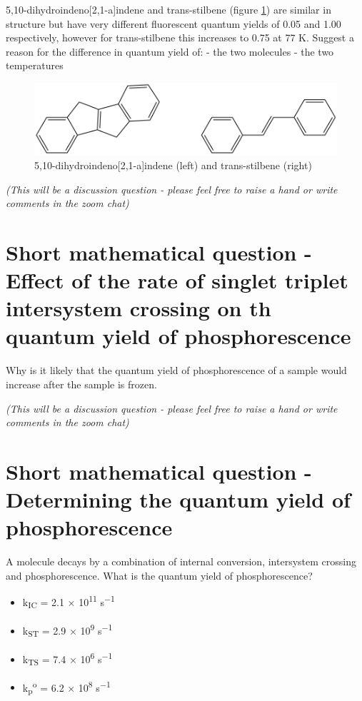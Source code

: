 \documentclass[
]{book}
\providecommand{\tightlist}{%
  \setlength{\itemsep}{0pt}\setlength{\parskip}{0pt}}
\begin{document}
5,10-dihydroindeno{[}2,1-a{]}indene and trans-stilbene (figure \ref{fig:stilbeneindene}) are similar in structure but have very different fluorescent quantum yields of 0.05 and 1.00 respectively, however for trans-stilbene this increases to 0.75 at 77 K. Suggest a reason for the difference in quantum yield of:
- the two molecules
- the two temperatures

\begin{figure}

{\centering \includegraphics[width=0.6\linewidth]{Images/stilbeneindene} 

}

\caption{5,10-dihydroindeno[2,1-a]indene (left) and trans-stilbene (right)}\label{fig:stilbeneindene}
\end{figure}

\emph{(This will be a discussion question - please feel free to raise a hand or write comments in the zoom chat)}

\hypertarget{sec:ratephos}{%
\section{Short mathematical question - Effect of the rate of singlet triplet intersystem crossing on th quantum yield of phosphorescence}\label{sec:ratephos}}

Why is it likely that the quantum yield of phosphorescence of a sample would increase after the sample is frozen.

\emph{(This will be a discussion question - please feel free to raise a hand or write comments in the zoom chat)}

\hypertarget{sec:calcphos}{%
\section{Short mathematical question - Determining the quantum yield of phosphorescence}\label{sec:calcphos}}

A molecule decays by a combination of internal conversion, intersystem crossing and phosphorescence. What is the quantum yield of phosphorescence?

\begin{itemize}
\tightlist
\item
  k\textsubscript{IC} = 2.1 × 10\textsuperscript{11} s\textsuperscript{−1}
\item
  k\textsubscript{ST} = 2.9 × 10\textsuperscript{9} s\textsuperscript{−1}
\item
  k\textsubscript{TS} = 7.4 × 10\textsuperscript{6} s\textsuperscript{−1}
\item
  k\textsubscript{p}\textsuperscript{o} = 6.2 × 10\textsuperscript{8} s\textsuperscript{−1}
\end{itemize}
\end{document}
